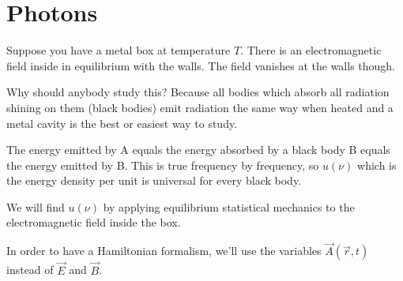 \section{Photons}
Suppose you have a metal box at temperature $T$.
There is an electromagnetic field inside in equilibrium with the walls.
The field vanishes at the walls though.

Why should anybody study this?
Because all bodies which absorb all radiation shining on them (black bodies)
emit radiation the same way when heated and a metal cavity is the best or
easiest way to study.

The energy emitted by A equals the energy absorbed by a black body B equals the
energy emitted by B.
This is true frequency by frequency,
so $u(\nu)$ which is the energy density per unit is universal for every black
body.

We will find $u(\nu)$ by applying equilibrium statistical mechanics to the
electromagnetic field inside the box.

In order to have a Hamiltonian formalism,
we'll use the variables
$\vec{A}(\vec{r}, t)$ instead of $\vec{E}$ and $\vec{B}$.

